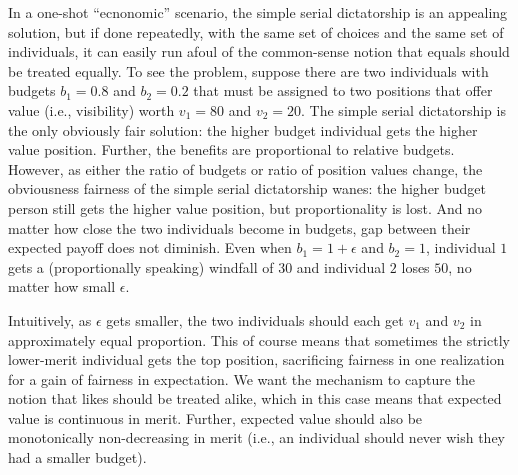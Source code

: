 In a one-shot ``ecnonomic'' scenario, the simple serial dictatorship
is an appealing solution, but if done repeatedly, with the same set of
choices and the same set of individuals, it can easily run afoul of
the common-sense notion that equals should be treated equally. To see
the problem, suppose there are two individuals with budgets $b_1 =
0.8$ and $b_2 = 0.2$ that must be assigned to two positions that offer
value (i.e., visibility) worth $v_1 = 80$ and $v_2 = 20$. The simple
serial dictatorship is the only obviously fair solution: the higher
budget individual gets the higher value position. Further, the
benefits are proportional to relative budgets. However, as either the
ratio of budgets or ratio of position values change, the obviousness
fairness of the simple serial dictatorship wanes: the higher budget
person still gets the higher value position, but proportionality is
lost. And no matter how close the two individuals become in budgets,
gap between their expected payoff does not diminish. Even when $b_1 =
1 + \epsilon$ and $b_2 = 1$, individual $1$ gets a (proportionally
speaking) windfall of $30$ and individual $2$ loses $50$, no matter
how small $\epsilon$.

Intuitively, as $\epsilon$ gets smaller, the two individuals should
each get $v_1$ and $v_2$ in approximately equal proportion. This of
course means that sometimes the strictly lower-merit individual gets
the top position, sacrificing fairness in one realization for a gain
of fairness in expectation. We want the mechanism to capture the
notion that likes should be treated alike, which in this case means
that expected value is continuous in merit. Further, expected value
should also be monotonically non-decreasing in merit (i.e., an
individual should never wish they had a smaller budget).





